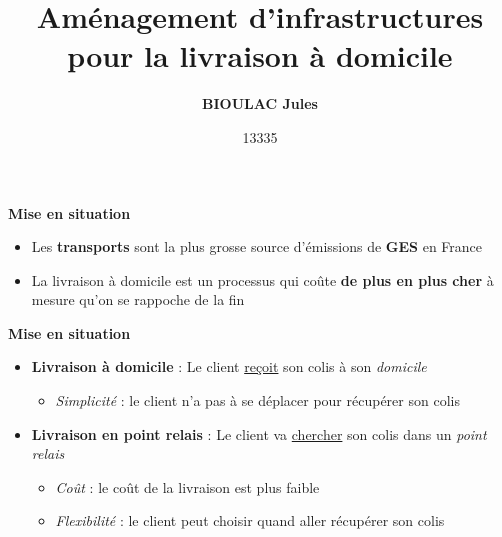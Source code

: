 \documentclass[10pt]{beamer}
\title{\textcolor{bleu_saphir}{\textbf{Aménagement d'infrastructures pour la livraison à domicile}}}
\author{\textcolor{bleu_saphir}{\textbf{BIOULAC Jules}}}
\date{\textcolor{bleu_saphir}{13335}}
\begin{document}
\begin{frame}[noframenumbering]

    \vspace{100pt}
    \maketitle

\end{frame}



\begin{frame}{\textbf{Mise en situation}}

    \begin{itemize}
        \item Les \textbf{transports} sont la plus grosse source d'émissions de \textbf{GES} en France
        \item La livraison à domicile est un processus qui coûte \textbf{de plus en plus cher} à mesure qu'on se rappoche de la fin
    \end{itemize}

\end{frame}


\begin{frame}{\textbf{Mise en situation}}
    
    \begin{itemize}
        \item \textbf{Livraison à domicile} : Le client \underline{reçoit} son colis à son \textit{domicile}
        \begin{itemize}
            \item \textit{Simplicité} : le client n'a pas à se déplacer pour récupérer son colis
        \end{itemize}
    \end{itemize}
    \vspace{15pt}
    \begin{itemize}
        \item \textbf{Livraison en point relais} : Le client va \underline{chercher} son colis dans un \textit{point relais}
        \begin{itemize}
            \item \textit{Coût} : le coût de la livraison est plus faible
            \item \textit{Flexibilité} : le client peut choisir quand aller récupérer son colis
        \end{itemize}
    \end{itemize}

\end{frame}
\end{document}
